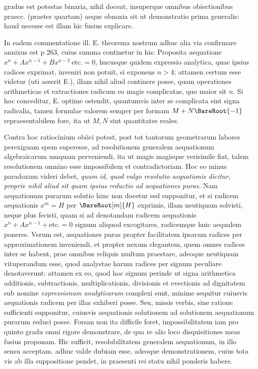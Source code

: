 gradus est potestas binaria, nihil doceat, insuperque omnibus obiectionibus praecc.
(praeter quartam) aeque obnoxia sit ut demonstratio prima generalis: haud necesse
est illam hic fusius explicare.

In eadem commentatione ill. E. theorema nostrum adhuc alia via confirmare
annixus est p 263, cuius summa continetur in his: Proposita aequatione
$x^n+Ax^{n-1}+Bx^{n-2}\ \text{etc.}=0$, hucusque quidem expressio analytica, quae ipsius
radices exprimat, inveniri non potuit, si exponens $n>4$; attamen certum esse
videtur (uti asserit E.), illam nihil aliud continere posse, quam operationes arithmeticas
et extractiones radicum eo magis complicatas, quo maior sit $n$. Si hoc
conceditur, E. optime ostendit, quantumvis inter se complicata sint signa radicalia,
tamen formulae valorem semper per formam $M+N\BareRoot{-1}$ repraesentabilem
fore, ita ut $M,N$ sint quantitates reales.

Contra hoc ratiocinium obiici potest, post tot tantorum geometrarum labores
perexiguam spem superesse, ad resolutionem generalem aequationum algebraicarum
umquam perveniendi, ita ut magis magisque verisimile fiat, talem resolutionem
omnino esse impossibilem et contradictoriam. Hoc eo minus paradoxum
videri debet, \textit{quum id, quod vulgo resolutio aequationis dicitur, proprie nihil aliud sit
quam ipsius reductio ad aequationes puras.} Nam aequationum purarum solutio hinc
non docetur sed supponitur, et si radicem aequationis $x^m=H$ per $\BareRoot[m]{H}$ exprimis,
illam neutiquam solvisti, neque plus fecisti, quam si ad denotandam radicem
aequationis $x^n+Ax^{n-1}+\text{etc.}=0$ signum aliquod excogitares, radicemque huic
aequalem poneres. Verum est, aequationes puras propter facilitatem ipsarum radices
per approximationem inveniendi, et propter nexum elegantem, quem omnes
radices inter se habent, prae omnibus reliquis multum praestare, adeoque neutiquam
vituperandum esse, quod analystae harum radices per signum peculiare denotaverunt:
attamen ex eo, quod hoc signum perinde ut signa arithmetica additionis,
subtractionis, multiplicationis, divisionis et evectionis ad dignitatem sub
nomine \textit{expressionum analyticarum} complexi sunt, minime sequitur cuiusvis aequationis
radicem per illas exhiberi posse. Seu, missis verbis, sine ratione sufficienti
supponitur, cuiusvis aequationis solutionem ad solutionem aequationum purarum
reduci posse. Forsan non ita difficile foret, impossibilitatem iam pro quinto gradu
omni rigore demonstrare, de qua re alio loco disquisitiones meas fusius proponam.
Hic sufficit, resolubilitatem generalem aequationum, in illo sensu acceptam. adhuc
valde dubiam esse, adeoque demonstrationem, cuius tota vis ab illa suppositione
pendet, in praesenti rei statu nihil ponderis habere.

